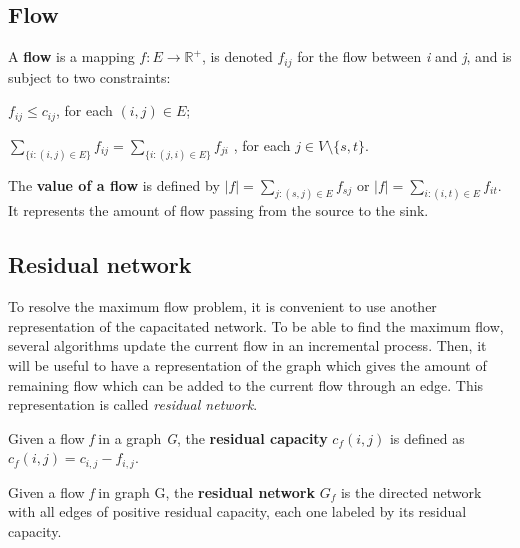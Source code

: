 \subsection{Flow}
\begin{definition}
\label{flow}
A \textbf{flow} is a mapping $f: E \to \mathbb{R}^{+}$, is denoted $f_{ij}$ for the flow between \textit{i} and \textit{j}, and is subject to two constraints:
\indent
\begin{description}
	\label{cap_constraint}
	\item[Capacity constraint] $f_{ij} \leq c_{ij}$, for each $(i, j) \in E$;
	\label{flow_constraint}
	\item[Flow conservation constraint] $\sum\limits_{\{i : (i,j) \in E\}} f_{ij} = \sum\limits_{\{i : (j,i) \in E\}} f_{ji}$ , for each $j \in V \setminus \{s, t\}$.
\end{description}
\end{definition}

\begin{definition}
\label{vflow}
The \textbf{value of a flow} is defined by $\left\vert{f}\right\vert = \sum\limits_{j:(s,j) \in E} f_{sj}$ or $\left\vert{f}\right\vert = \sum\limits_{i:(i,t) \in E} f_{it}$. It represents the amount of flow passing from the source to the sink.
\end{definition}

\subsection{Residual network} 
To resolve the maximum flow problem, it is convenient to use another representation of the capacitated network. To be able to find the maximum flow, several algorithms update the current flow in an incremental process. Then, it will be useful to have a representation of the graph which gives the amount of remaining flow which can be added to the current flow through an edge. This representation is called \textit{residual network}.
\begin{definition}
\label{rcapacity}
Given a flow \textit{f} in a graph \textit{G}, the \textbf{residual capacity} $c_f (i,j)$ is defined as $c_f (i,j) = c_{i,j} - f_{i,j}$.
\end{definition}


\begin{definition}
\label{rnetwork}
Given a flow \textit{f} in graph G, the \textbf{residual network} $G_f$ is the directed network with all edges of positive residual capacity, each one labeled by its residual capacity.
\end{definition}

